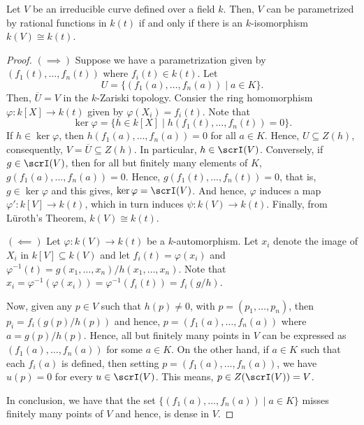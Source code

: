 \begin{theorem}
    Let $V$ be an irreducible curve defined over a field $k$. Then, $V$ can be parametrized by rational functions in $k(t)$ if and only if there is an $k$-isomorphism $k(V)\cong k(t)$.
\end{theorem}
\begin{proof}
    $(\implies)$ Suppose we have a parametrization given by $(f_1(t),\dots,f_n(t))$ where $f_i(t)\in k(t)$. Let 
    \begin{equation*}
        U = \{(f_1(a),\dots, f_n(a))\mid a\in K\}.
    \end{equation*}
    Then, $\overline U = V$ in the $k$-Zariski topology. Consier the ring homomorphism $\varphi: k[X]\to k(t)$ given by $\varphi(X_i) = f_i(t)$. Note that 
    \begin{equation*}
        \ker\varphi = \{h\in k[X]\mid h(f_1(t),\dots,f_n(t)) = 0\}.
    \end{equation*}
    If $h\in\ker\varphi$, then $h(f_1(a),\dots,f_n(a)) = 0$ for all $a\in K$. Hence, $U\subseteq Z(h)$, consequently, $V = \overline U\subseteq Z(h)$. In particular, $h\in\scrI(V)$. Conversely, if $g\in\scrI(V)$, then for all but finitely many elements of $K$, $g(f_1(a),\dots,f_n(a)) = 0$. Hence, $g(f_1(t),\dots, f_n(t)) = 0$, that is, $g\in\ker\varphi$ and this gives, $\ker\varphi = \scrI(V)$. And hence, $\varphi$ induces a map $\varphi': k[V]\to k(t)$, which in turn induces $\psi: k(V)\to k(t)$. Finally, from L\"uroth's Theorem, $k(V)\cong k(t)$.

    $(\impliedby)$ Let $\varphi: k(V)\to k(t)$ be a $k$-automorphism. Let $x_i$ denote the image of $X_i$ in $k[V]\subseteq k(V)$ and let $f_i(t) = \varphi(x_i)$ and $\varphi^{-1}(t) = g(x_1,\dots,x_n)/h(x_1,\dots,x_n)$. Note that $x_i = \varphi^{-1}(\varphi(x_i)) = \varphi^{-1}(f_i(t)) = f_i(g/h)$. 

    Now, given any $p\in V$ such that $h(p)\ne 0$, with $p = (p_1,\dots,p_n)$, then $p_i = f_i(g(p)/h(p))$ and hence, $p = (f_1(a),\dots,f_n(a))$ where $a = g(p)/h(p)$. Hence, all but finitely many points in $V$ can be expressed as $(f_1(a),\dots,f_n(a))$ for some $a\in K$. On the other hand, if $a\in K$ such that each $f_i(a)$ is defined, then setting $p = (f_1(a),\dots,f_n(a))$, we have $u(p) = 0$ for every $u\in\scrI(V)$. This means, $p\in Z(\scrI(V)) = V$.

    In conclusion, we have that the set $\{(f_1(a),\dots,f_n(a))\mid a\in K\}$ misses finitely many points of $V$ and hence, is dense in $V$.
\end{proof}